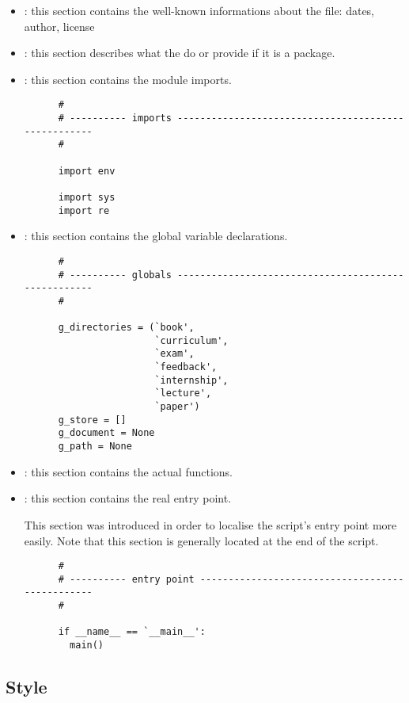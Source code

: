 \begin{itemize}
  \item
    : this section contains the well-known informations about
    the file: dates, author, license \etc{}
  \item
    : this section describes what the 
    do or provide if it is a package.
  \item
    : this section contains the module imports.

    \begin{verbatim}
      #
      # ---------- imports ----------------------------------------------------
      #

      import env

      import sys
      import re
    \end{verbatim}
  \item
    : this section contains the global variable declarations.

    \begin{verbatim}
      #
      # ---------- globals ----------------------------------------------------
      #

      g_directories = (`book',
                       `curriculum',
                       `exam',
                       `feedback',
                       `internship',
                       `lecture',
                       `paper')
      g_store = []
      g_document = None
      g_path = None
    \end{verbatim}
  \item
    : this section contains the actual 
    functions.
  \item
    : this section contains the real entry point.

    This section was introduced in order to localise the script's entry
    point more easily. Note that this section is generally located at
    the end of the script.

    \begin{verbatim}
      #
      # ---------- entry point ------------------------------------------------
      #

      if __name__ == `__main__':
        main()
    \end{verbatim}
\end{itemize}

%
%

\subsection{Style}

